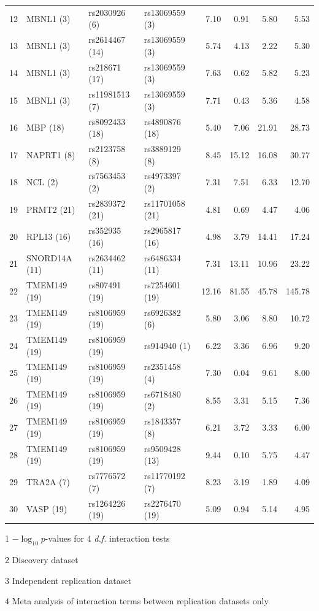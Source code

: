 \documentclass{article}
\begin{document}
\begin{table}[ht]
\begin{threeparttable}
{\begin{tabular}{rlllrrrr}
  12 & MBNL1 (3)  & rs2030926 (6)  & rs13069559 (3)  & 7.10 & 0.91 & 5.80 & 5.53 \\
  13 & MBNL1 (3)  & rs2614467 (14)  & rs13069559 (3)  & 5.74 & 4.13 & 2.22 & 5.30 \\
  14 & MBNL1 (3)  & rs218671 (17)  & rs13069559 (3)  & 7.63 & 0.62 & 5.82 & 5.23 \\
  15 & MBNL1 (3)  & rs11981513 (7)  & rs13069559 (3)  & 7.71 & 0.43 & 5.36 & 4.58 \\
  16 & MBP (18)  & rs8092433 (18)  & rs4890876 (18)  & 5.40 & 7.06 & 21.91 & 28.73 \\
  17 & NAPRT1 (8)  & rs2123758 (8)  & rs3889129 (8)  & 8.45 & 15.12 & 16.08 & 30.77 \\
  18 & NCL (2)  & rs7563453 (2)  & rs4973397 (2)  & 7.31 & 7.51 & 6.33 & 12.70 \\
  19 & PRMT2 (21)  & rs2839372 (21)  & rs11701058 (21)  & 4.81 & 0.69 & 4.47 & 4.06 \\
  20 & RPL13 (16)  & rs352935 (16)  & rs2965817 (16)  & 4.98 & 3.79 & 14.41 & 17.24 \\
  21 & SNORD14A (11)  & rs2634462 (11)  & rs6486334 (11)  & 7.31 & 13.11 & 10.96 & 23.22 \\
  22 & TMEM149 (19)  & rs807491 (19)  & rs7254601 (19)  & 12.16 & 81.55 & 45.78 & 145.78 \\
  23 & TMEM149 (19)  & rs8106959 (19)  & rs6926382 (6)  & 5.80 & 3.06 & 8.80 & 10.72 \\
  24 & TMEM149 (19)  & rs8106959 (19)  & rs914940 (1)  & 6.22 & 3.36 & 6.96 & 9.20 \\
  25 & TMEM149 (19)  & rs8106959 (19)  & rs2351458 (4)  & 7.30 & 0.04 & 9.61 & 8.00 \\
  26 & TMEM149 (19)  & rs8106959 (19)  & rs6718480 (2)  & 8.55 & 3.31 & 5.15 & 7.36 \\
  27 & TMEM149 (19)  & rs8106959 (19)  & rs1843357 (8)  & 6.21 & 3.72 & 3.33 & 6.00 \\
  28 & TMEM149 (19)  & rs8106959 (19)  & rs9509428 (13)  & 9.44 & 0.10 & 5.75 & 4.47 \\
  29 & TRA2A (7)  & rs7776572 (7)  & rs11770192 (7)  & 8.23 & 3.19 & 1.89 & 4.09 \\
  30 & VASP (19)  & rs1264226 (19)  & rs2276470 (19)  & 5.09 & 0.94 & 5.14 & 4.95 \\
   \hline
		\end{tabular}
		}
		\begin{tablenotes}
			\item [1] $-\log_{10} p$-values for 4 \emph{d.f.} interaction tests
			\item [2] Discovery dataset
			\item [3] Independent replication dataset
			\item [4] Meta analysis of interaction terms between replication datasets only
		\end{tablenotes}
	\end{threeparttable}
\end{table}
\end{document}
